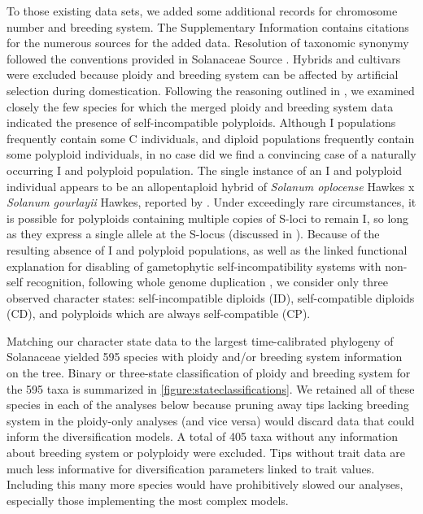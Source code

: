 
To those existing data sets, we added some additional records for chromosome number and breeding system.
The Supplementary Information contains citations for the numerous sources for the added data. %
Resolution of taxonomic synonymy followed the conventions provided in Solanaceae Source \citep{solsource}. 
Hybrids and cultivars were excluded because ploidy and breeding system can be affected by artificial selection during domestication.
Following the reasoning outlined in \citet{robertson_2011}, we examined closely the few species for which the merged ploidy and breeding system data indicated the presence of self-incompatible polyploids.
Although I populations frequently contain some C individuals, and diploid populations frequently contain some polyploid individuals, in no case did we find a convincing case of a naturally occurring I and polyploid population.
The single instance of an I and polyploid individual appears to be an allopentaploid hybrid of {\em Solanum oplocense} Hawkes x {\em Solanum gourlayii} Hawkes, reported by \citealt{camadro_1981}.
Under exceedingly rare circumstances, it is possible for polyploids containing multiple copies of S-loci to remain I, so long as they express a single allele at the S-locus (discussed in \citealt{robertson_2011}).
Because of the resulting absence of I and polyploid populations, as well as the linked functional explanation for disabling of gametophytic self-incompatibility systems with non-self recognition, following whole genome duplication \citep[reviewed in][]{ramsey_1998,stone_2002}, we consider only three observed character states: self-incompatible diploids (ID), self-compatible diploids (CD), and polyploids which are always self-compatible (CP).

Matching our character state data to the largest time-calibrated phylogeny of Solanaceae \citep{sarkinen_2013} yielded 595 species with ploidy and/or breeding system information on the tree.
Binary or three-state classification of ploidy and breeding system for the 595 taxa is summarized in \cref{figure:stateclassifications}.
We retained all of these species in each of the analyses below because pruning away tips lacking breeding system in the ploidy-only analyses (and vice versa) would discard data that could inform the diversification models.
A total of 405 taxa without any information about breeding system or polyploidy were excluded.
Tips without trait data are much less informative for diversification parameters linked to trait values.
Including this many more species would have prohibitively slowed our analyses, especially those implementing the most complex models.


